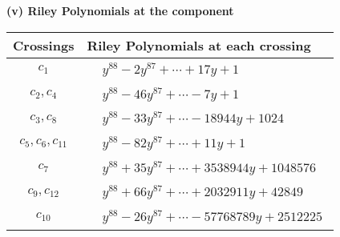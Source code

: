 \documentclass[1p]{elsarticle_modified}
\theoremstyle{definition}
\begin{document}
\flushleft \textbf{(v) Riley Polynomials at the component}\newline \\
\begin{tabular}{m{50pt}|m{274pt}}
Crossings & \hspace{64pt}Riley Polynomials at each crossing \\
\hline $$\begin{aligned}c_{1}\end{aligned}$$&$\begin{aligned}
&y^{88}-2 y^{87}+\cdots+17 y+1
\end{aligned}$\\
\hline $$\begin{aligned}c_{2},c_{4}\end{aligned}$$&$\begin{aligned}
&y^{88}-46 y^{87}+\cdots-7 y+1
\end{aligned}$\\
\hline $$\begin{aligned}c_{3},c_{8}\end{aligned}$$&$\begin{aligned}
&y^{88}-33 y^{87}+\cdots-18944 y+1024
\end{aligned}$\\
\hline $$\begin{aligned}c_{5},c_{6},c_{11}\end{aligned}$$&$\begin{aligned}
&y^{88}-82 y^{87}+\cdots+11 y+1
\end{aligned}$\\
\hline $$\begin{aligned}c_{7}\end{aligned}$$&$\begin{aligned}
&y^{88}+35 y^{87}+\cdots+3538944 y+1048576
\end{aligned}$\\
\hline $$\begin{aligned}c_{9},c_{12}\end{aligned}$$&$\begin{aligned}
&y^{88}+66 y^{87}+\cdots+2032911 y+42849
\end{aligned}$\\
\hline $$\begin{aligned}c_{10}\end{aligned}$$&$\begin{aligned}
&y^{88}-26 y^{87}+\cdots-57768789 y+2512225
\end{aligned}$\\
\hline
\end{tabular}\\~\\
\end{document}

